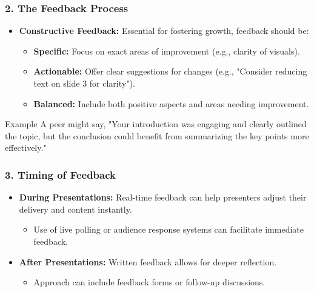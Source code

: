 \documentclass[aspectratio=169]{beamer}
\begin{document}
\begin{frame}[fragile]
    \frametitle{2. The Feedback Process}
    \begin{itemize}
        \item \textbf{Constructive Feedback:} Essential for fostering growth, feedback should be:
        \begin{itemize}
            \item \textbf{Specific:} Focus on exact areas of improvement (e.g., clarity of visuals).
            \item \textbf{Actionable:} Offer clear suggestions for changes (e.g., "Consider reducing text on slide 3 for clarity").
            \item \textbf{Balanced:} Include both positive aspects and areas needing improvement.
        \end{itemize}
    \end{itemize}
    \begin{block}{Example}
        A peer might say, "Your introduction was engaging and clearly outlined the topic, but the conclusion could benefit from summarizing the key points more effectively."
    \end{block}
\end{frame}

\begin{frame}[fragile]
    \frametitle{3. Timing of Feedback}
    \begin{itemize}
        \item \textbf{During Presentations:} Real-time feedback can help presenters adjust their delivery and content instantly.
        \begin{itemize}
            \item Use of live polling or audience response systems can facilitate immediate feedback.
        \end{itemize}
        \item \textbf{After Presentations:} Written feedback allows for deeper reflection.
        \begin{itemize}
            \item Approach can include feedback forms or follow-up discussions.
        \end{itemize}
    \end{itemize}
\end{frame}
\end{document}
